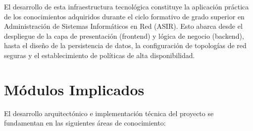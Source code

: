 \documentclass[12pt,a4paper]{article}
\begin{document}
El desarrollo de esta infraestructura tecnológica constituye la aplicación práctica de los conocimientos adquiridos durante el ciclo formativo de grado superior en Administración de Sistemas Informáticos en Red (ASIR). Esto abarca desde el despliegue de la capa de presentación (frontend) y lógica de negocio (backend), hasta el diseño de la persistencia de datos, la configuración de topologías de red seguras y el establecimiento de políticas de alta disponibilidad.

\newpage
\section{Módulos Implicados}
\label{Modulos}

El desarrollo arquitectónico e implementación técnica del proyecto se fundamentan en las siguientes áreas de conocimiento:
\end{document}
